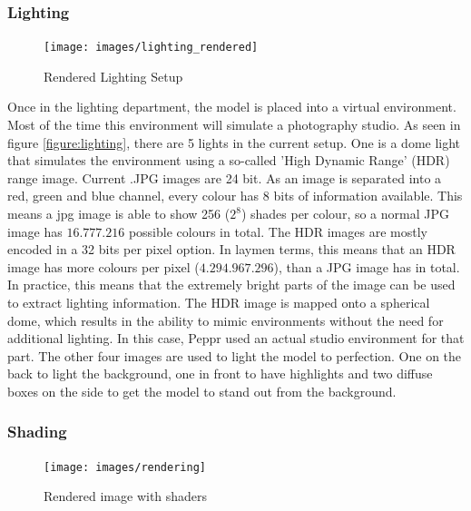 \subsubsection{Lighting}

\begin{figure}
\vspace{-1cm}
\centering
\texttt{[image: images/lighting\_rendered]}
\caption{Rendered Lighting Setup}
\label{figure:lighting_rendered}
\end{figure}

Once in the lighting department, the model is placed into a virtual environment. Most of the time this environment will simulate a photography studio. As seen in figure \ref{figure:lighting}, there are 5 lights in the current setup. One is a dome light that simulates the environment using a so-called 'High Dynamic Range' (HDR) range image. Current .JPG images are 24 bit. As an image is separated into a red, green and blue channel, every colour has 8 bits of information available. This means a jpg image is able to show 256 ($2^8$) shades per colour, so a normal JPG image has $16.777.216$ possible colours in total. \newline
The HDR images are mostly encoded in a 32 bits per pixel option. In laymen terms, this means that an HDR image has more colours per pixel ($4.294.967.296$), than a JPG image has in total. In practice, this means that the extremely bright parts of the image can be used to extract lighting information. The HDR image is mapped onto a spherical dome, which results in the ability to mimic environments without the need for additional lighting. In this case, Peppr used an actual studio environment for that part.
 The other four images are used to light the model to perfection. One on the back to light the background, one in front to have highlights and two diffuse boxes on the side to get the model to stand out from the background.


\subsubsection{Shading}

\begin{figure}
\vspace{-1cm}
\centering
\texttt{[image: images/rendering]}
\caption{Rendered image with shaders}
\label{figure:lighting_rendered}
\end{figure}


